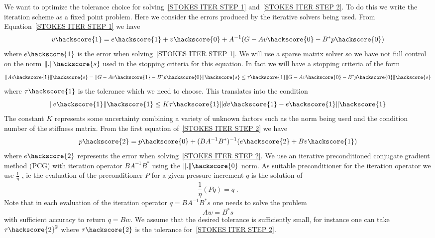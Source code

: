 We want to optimize the tolerance choice for solving~\ref{STOKES ITER STEP 1}
and~\ref{STOKES ITER STEP 2}. To do this we write the iteration scheme as a fixed point problem. Here
we consider the errors produced by the iterative solvers being used. 
From Equation~\ref{STOKES ITER STEP 1} we have 
\begin{equation} \label{STOKES total V1}
v\hackscore{1} = e\hackscore{1} + v\hackscore{0} + A^{-1} ( G - Av\hackscore{0} - B^{*} p\hackscore{0} ) 
\end{equation}
where $ e\hackscore{1}$ is the error when solving~\ref{STOKES ITER STEP 1}.  
We will use a sparse matrix solver so we have not full control on the norm $\|.\|\hackscore{s}$ used in the stopping criteria for this equation. In fact we will have a stopping criteria of the form 
\begin{equation} 
\| A e\hackscore{1} \|\hackscore{s}  = \| G - A v\hackscore{1} - B^{*} p\hackscore{0} \|\hackscore{s} \le \tau\hackscore{1} \| G - A v\hackscore{0} - B^{*} p\hackscore{0} \|\hackscore{s} 
\end{equation}
where $\tau\hackscore{1}$ is the tolerance which we need to choose. This translates into the condition
\begin{equation} 
\| e\hackscore{1} \|\hackscore{1} \le K \tau\hackscore{1} \| dv\hackscore{1} - e\hackscore{1} \|\hackscore{1} 
\end{equation}
The constant $K$ represents some uncertainty combining a variety of unknown factors such as the 
norm being used and the condition number of the stiffness matrix.  
From the first equation of~\ref{STOKES ITER STEP 2} we have
\begin{equation}\label{STOKES total P2}
p\hackscore{2} =  p\hackscore{0} + (B A^{-1} B^{*})^{-1} (e\hackscore{2} + Bv\hackscore{1} )
\end{equation}
where $e\hackscore{2}$ represents the error when solving~\ref{STOKES ITER STEP 2}.
We use an iterative preconditioned conjugate gradient method (PCG)  with iteration 
operator $B A^{-1} B^{*}$ using the $\|.\|\hackscore{0}$ norm. As suitable preconditioner  for the iteration
operator we use $\frac{1}{\eta}$ \cite{ELMAN}, ie 
the evaluation of the preconditioner $P$ for a given pressure increment $q$ is the solution of
\begin{equation} \label{STOKES P PREC}
\frac{1}{\eta} (Pq) = q \; . 
\end{equation}
Note that in each evaluation of the iteration operator $q=B A^{-1} B^{*} s$ one needs to solve
the problem
\begin{equation} \label{STOKES P OPERATOR}
A w = B^{*} s 
\end{equation}
with sufficient accuracy to return $q=Bw$. We assume that the desired tolerance is 
sufficiently small, for instance one can take $\tau\hackscore{2}^2$ 
where $\tau\hackscore{2}$ is the tolerance for~\ref{STOKES ITER STEP 2}.

